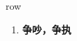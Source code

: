 
\begin{frame}
{\huge row}
\begin{center}
\begin{enumerate}\Large
  \item \textbf{争吵，争执}
\end{enumerate}
\end{center}
\end{frame}
